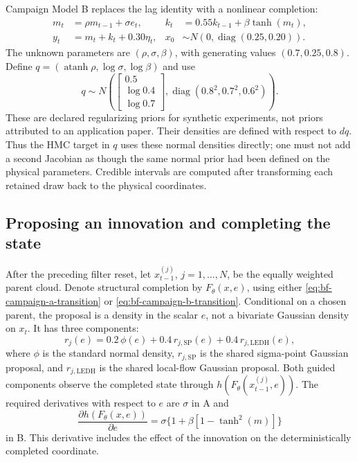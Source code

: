 Campaign Model B replaces the lag identity with a nonlinear completion:
\begin{align}
 m_t &= \rho m_{t-1}+\sigma e_t,
 & k_t &=0.55k_{t-1}+\beta\tanh(m_t),
 \label{eq:bf-campaign-b-transition}\\
 y_t &=m_t+k_t+0.30\eta_t,
 & x_0 &\sim N\!\left(0,\operatorname{diag}(0.25,0.20)\right).
\end{align}
The unknown parameters are $(\rho,\sigma,\beta)$, with generating values
$(0.7,0.25,0.8)$.  Define
$q=(\operatorname{atanh}\rho,\log\sigma,\log\beta)$ and use
\[
 q\sim N\!\left(
 \begin{bmatrix}0.5\\\log 0.4\\\log 0.7\end{bmatrix},
 \operatorname{diag}(0.8^2,0.7^2,0.6^2)\right).
\]
These are declared regularizing priors for synthetic experiments, not priors
attributed to an application paper.  Their densities are defined with respect
to $dq$.  Thus the HMC target in $q$ uses these normal densities directly;
one must not add a second Jacobian as though the same normal prior had been
defined on the physical parameters.  Credible intervals are computed after
transforming each retained draw back to the physical coordinates.

\subsection{Proposing an innovation and completing the state}

After the preceding filter reset, let $x_{t-1}^{(j)}$, $j=1,\ldots,N$, be
the equally weighted parent cloud.  Denote structural completion by
$F_\theta(x,e)$, using either
\eqref{eq:bf-campaign-a-transition} or
\eqref{eq:bf-campaign-b-transition}.  Conditional on a chosen parent, the
proposal is a density in the scalar $e$, not a bivariate Gaussian density on
$x_t$.  It has three components:
\begin{equation}
 r_j(e)=0.2\,\phi(e)+0.4\,r_{j,\mathrm{SP}}(e)
                       +0.4\,r_{j,\mathrm{LEDH}}(e),
 \label{eq:bf-structural-campaign-mixture}
\end{equation}
where $\phi$ is the standard normal density, $r_{j,\mathrm{SP}}$ is the
shared sigma-point Gaussian proposal, and $r_{j,\mathrm{LEDH}}$ is the shared
local-flow Gaussian proposal.  Both guided components observe the completed
state through $h(F_\theta(x_{t-1}^{(j)},e))$.  The required derivatives with
respect to $e$ are $\sigma$ in A and
\[
 \frac{\partial h(F_\theta(x,e))}{\partial e}
   =\sigma\{1+\beta[1-\tanh^2(m)]\}
\]
in B.  This derivative includes the effect of the innovation on the
deterministically completed coordinate.

